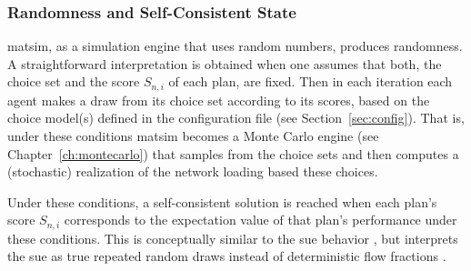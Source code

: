 \subsubsection{Randomness and Self-Consistent State}
\label{ch:economicEval:describingBehavior:discreteChoice:quenchedVsAnnealed}
%
%
\acrshort{matsim}, as a simulation engine that uses random numbers, produces randomness.
%
A straightforward interpretation is obtained when one assumes that both, the choice set and the score $S_{n,i}$ of each plan, 
%
%
are fixed. Then in each iteration each agent makes a draw from its choice set according to its scores, based on the choice model(s) defined in the configuration file (see Section~\ref{sec:config}).
%
%
%
That is, under these conditions \acrshort{matsim} becomes a Monte Carlo engine
%
(see Chapter~\ref{ch:montecarlo})
%
%
%
that samples from the choice sets and then computes a (stochastic) realization of the network loading based these choices.

Under these conditions, a self-consistent solution is reached when each plan's score $S_{n,i}$ corresponds to the expectation value of that plan's performance under these conditions.
%
%
%
This is conceptually similar to the \gls{sue} behavior \citep{DaganzoSheffi1977SUE}, but interprets the \gls{sue} as true repeated random draws instead of deterministic flow fractions \citep{NagelFloetteroed2009IatbrResourceInBook}.

